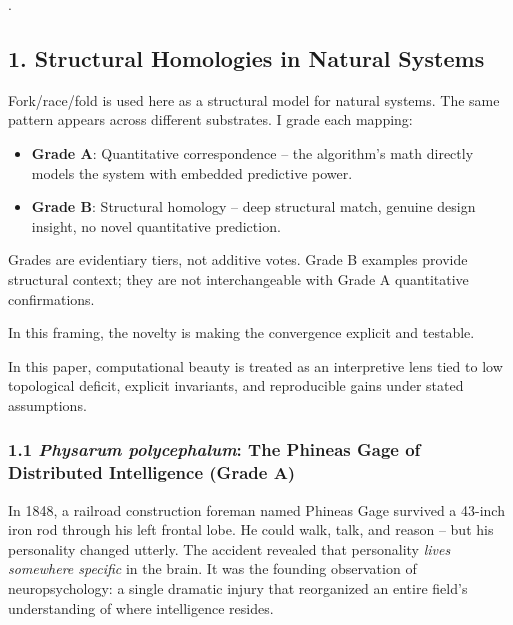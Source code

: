 \documentclass[
]{article}
\providecommand{\tightlist}{%
  \setlength{\itemsep}{0pt}\setlength{\parskip}{0pt}}
\begin{document}
.

\subsection{\texorpdfstring{\textbf{1. Structural Homologies in Natural
Systems}}{1. Structural Homologies in Natural Systems}}\label{structural-homologies-in-natural-systems}

Fork/race/fold is used here as a structural model for natural systems.
The same pattern appears across different substrates. I grade each
mapping:

\begin{itemize}
\tightlist
\item
  \textbf{Grade A}: Quantitative correspondence -- the algorithm's math
  directly models the system with embedded predictive power.\\
\item
  \textbf{Grade B}: Structural homology -- deep structural match,
  genuine design insight, no novel quantitative prediction.
\end{itemize}

Grades are evidentiary tiers, not additive votes. Grade B examples
provide structural context; they are not interchangeable with Grade A
quantitative confirmations.

In this framing, the novelty is making the convergence explicit and
testable.

In this paper, computational beauty is treated as an interpretive lens
tied to low topological deficit, explicit invariants, and reproducible
gains under stated assumptions.

\subsubsection{\texorpdfstring{\textbf{1.1 \emph{Physarum polycephalum}:
The Phineas Gage of Distributed Intelligence (Grade
A)}}{1.1 Physarum polycephalum: The Phineas Gage of Distributed Intelligence (Grade A)}}\label{physarum-polycephalum-the-phineas-gage-of-distributed-intelligence-grade-a}

In 1848, a railroad construction foreman named Phineas Gage survived a
43-inch iron rod through his left frontal lobe. He could walk, talk, and
reason -- but his personality changed utterly. The accident revealed
that personality \emph{lives somewhere specific} in the brain. It was
the founding observation of neuropsychology: a single dramatic injury
that reorganized an entire field's understanding of where intelligence
resides.
\end{document}
